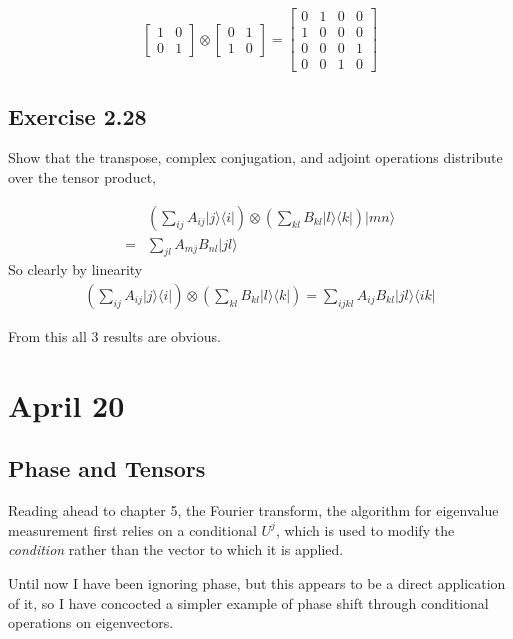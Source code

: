 \documentclass[]{article}
\newcommand{\bra}[1]{\langle #1 |}
\newcommand{\ket}[1]{| #1 \rangle}
\begin{document}
\[
\left[\begin{matrix}
1 & 0 \\
0 & 1
\end{matrix}\right]
\otimes
\left[\begin{matrix}
0 & 1 \\
1 & 0
\end{matrix}\right]
=
\left[\begin{matrix}
0 & 1 & 0 & 0 \\
1 & 0 & 0 & 0 \\
0 & 0 & 0 & 1 \\
0 & 0 & 1 & 0
\end{matrix}\right]
\]

\subsection{Exercise 2.28}

Show that the transpose, complex conjugation, and adjoint operations distribute over the tensor product,

\begin{align*}
&\left(\sum_{ij}A_{ij}\ket{j}\bra{i}\right)
\otimes
\left(\sum_{kl}B_{kl}\ket{l}\bra{k}\right)\ket{mn}
\\= &\sum_{jl}A_{mj}B_{nl} \ket{jl}
\end{align*}
So clearly by linearity
\begin{align*}
\left(\sum_{ij}A_{ij}\ket{j}\bra{i}\right)
\otimes
\left(\sum_{kl}B_{kl}\ket{l}\bra{k}\right)
=
\sum_{ijkl}A_{ij}B_{kl} \ket{jl}\bra{ik}
\end{align*}

From this all 3 results are obvious.

\section{April 20}

\subsection{Phase and Tensors}

Reading ahead to chapter 5, the Fourier transform, the algorithm for eigenvalue measurement first relies on a conditional $U^j$, which is used to modify the \textit{condition} rather than the vector to which it is applied.

Until now I have been ignoring phase, but this appears to be a direct application of it, so I have concocted a simpler example of phase shift through conditional operations on eigenvectors.
\end{document}
